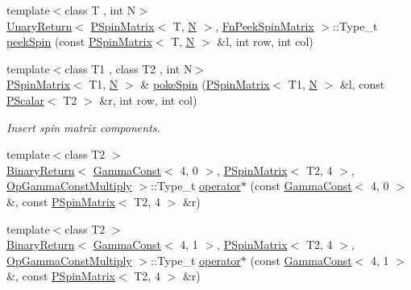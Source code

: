 \begin{DoxyCompactItemize}
\item 
{\footnotesize template$<$class T , int N$>$ }\\\mbox{\hyperlink{structENSEM_1_1UnaryReturn}{Unary\+Return}}$<$ \mbox{\hyperlink{classENSEM_1_1PSpinMatrix}{P\+Spin\+Matrix}}$<$ T, \mbox{\hyperlink{operator__name__util_8cc_a7722c8ecbb62d99aee7ce68b1752f337}{N}} $>$, \mbox{\hyperlink{structENSEM_1_1FnPeekSpinMatrix}{Fn\+Peek\+Spin\+Matrix}} $>$\+::Type\+\_\+t \mbox{\hyperlink{group__primspinmatrix_ga2af6db806ff17a39ca84960a216d33c7}{peek\+Spin}} (const \mbox{\hyperlink{classENSEM_1_1PSpinMatrix}{P\+Spin\+Matrix}}$<$ T, \mbox{\hyperlink{operator__name__util_8cc_a7722c8ecbb62d99aee7ce68b1752f337}{N}} $>$ \&l, int row, int col)
\item 
{\footnotesize template$<$class T1 , class T2 , int N$>$ }\\\mbox{\hyperlink{classENSEM_1_1PSpinMatrix}{P\+Spin\+Matrix}}$<$ T1, \mbox{\hyperlink{operator__name__util_8cc_a7722c8ecbb62d99aee7ce68b1752f337}{N}} $>$ \& \mbox{\hyperlink{group__primspinmatrix_ga79a215ef6e9982decb24addd77e93dae}{poke\+Spin}} (\mbox{\hyperlink{classENSEM_1_1PSpinMatrix}{P\+Spin\+Matrix}}$<$ T1, \mbox{\hyperlink{operator__name__util_8cc_a7722c8ecbb62d99aee7ce68b1752f337}{N}} $>$ \&l, const \mbox{\hyperlink{classENSEM_1_1PScalar}{P\+Scalar}}$<$ T2 $>$ \&r, int row, int col)
\begin{DoxyCompactList}\small\item\em Insert spin matrix components. \end{DoxyCompactList}\item 
{\footnotesize template$<$class T2 $>$ }\\\mbox{\hyperlink{structENSEM_1_1BinaryReturn}{Binary\+Return}}$<$ \mbox{\hyperlink{classENSEM_1_1GammaConst}{Gamma\+Const}}$<$ 4, 0 $>$, \mbox{\hyperlink{classENSEM_1_1PSpinMatrix}{P\+Spin\+Matrix}}$<$ T2, 4 $>$, \mbox{\hyperlink{structENSEM_1_1OpGammaConstMultiply}{Op\+Gamma\+Const\+Multiply}} $>$\+::Type\+\_\+t \mbox{\hyperlink{group__primspinmatrix_ga3c278ae3c7e7dc6db3a144f463999af2}{operator$\ast$}} (const \mbox{\hyperlink{classENSEM_1_1GammaConst}{Gamma\+Const}}$<$ 4, 0 $>$ \&, const \mbox{\hyperlink{classENSEM_1_1PSpinMatrix}{P\+Spin\+Matrix}}$<$ T2, 4 $>$ \&r)
\item 
{\footnotesize template$<$class T2 $>$ }\\\mbox{\hyperlink{structENSEM_1_1BinaryReturn}{Binary\+Return}}$<$ \mbox{\hyperlink{classENSEM_1_1GammaConst}{Gamma\+Const}}$<$ 4, 1 $>$, \mbox{\hyperlink{classENSEM_1_1PSpinMatrix}{P\+Spin\+Matrix}}$<$ T2, 4 $>$, \mbox{\hyperlink{structENSEM_1_1OpGammaConstMultiply}{Op\+Gamma\+Const\+Multiply}} $>$\+::Type\+\_\+t \mbox{\hyperlink{group__primspinmatrix_gafa6af9df04bb90ce7675e5c8f4b13ac8}{operator$\ast$}} (const \mbox{\hyperlink{classENSEM_1_1GammaConst}{Gamma\+Const}}$<$ 4, 1 $>$ \&, const \mbox{\hyperlink{classENSEM_1_1PSpinMatrix}{P\+Spin\+Matrix}}$<$ T2, 4 $>$ \&r)

\end{DoxyCompactItemize}
